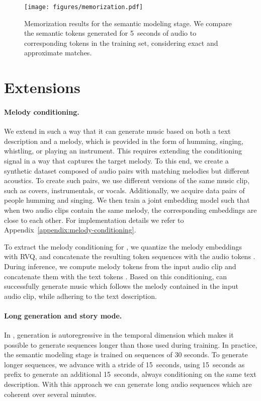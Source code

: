 \begin{figure}[t]
\begin{center}
    \centerline{\texttt{[image: figures/memorization.pdf]}}
    \vspace{-2mm}
    \caption{Memorization results for the semantic modeling stage. We compare the semantic tokens generated for 5~seconds of audio to corresponding tokens in the training set, considering exact and approximate matches.}
    \label{fig:memorization}
    \vspace{-6mm}
\end{center}
\end{figure}



\section{Extensions}
\paragraph{Melody conditioning.}
\label{melody-conditioning}
We extend {\model} in such a way that it can generate music based on both a text description and a melody, which is provided in the form of humming, singing, whistling, or playing an instrument. 
This requires extending the conditioning signal in a way that captures the target melody. To this end, we create a synthetic dataset composed of audio pairs with matching melodies but different acoustics. To create such pairs, we use different versions of the same music clip, such as covers, instrumentals, or vocals. Additionally, we acquire data pairs of people humming and singing. We then train a joint embedding model such that when two audio clips contain the same melody, the corresponding embeddings are close to each other. For implementation details we refer to Appendix~\ref{appendix:melody-conditioning}. 

To extract the melody conditioning for {\model}, we quantize the melody embeddings with RVQ, and concatenate the resulting token sequences with the {\mulan} audio tokens .
During inference, we compute melody tokens from the input audio clip and concatenate them with the {\mulan} text tokens .
Based on this conditioning, {\model} can successfully generate music which follows the melody contained in the input audio clip, while adhering to the text description.

\paragraph{Long generation and story mode.}
\label{story-mode}
In {\model}, generation is autoregressive in the temporal dimension which makes it possible to generate sequences longer than those used during training. In practice, the semantic modeling stage is trained on sequences of 30 seconds. To generate longer sequences, we advance with a stride of 15~seconds, using 15~seconds as prefix to generate an additional 15~seconds, always conditioning on the same text description. With this approach we can generate long audio sequences which are coherent over several minutes.

